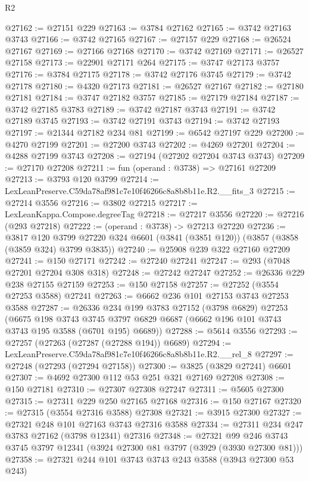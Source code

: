 \begin{lexlean}{R2}
\begin{coremodule}
@27162 := @27151 @229
@27163 := @3784 @27162
@27165 := @3742 @27163 @3743
@27166 := @3742 @27165
@27167 := @27157 @229
@27168 := @26524 @27167
@27169 := @27166 @27168
@27170 := @3742 @27169
@27171 := @26527 @27158
@27173 := @22901 @27171 @264
@27175 := @3747 @27173 @3757
@27176 := @3784 @27175
@27178 := @3742 @27176 @3745
@27179 := @3742 @27178
@27180 := @4320 @27173
@27181 := @26527 @27167
@27182 := @27180 @27181
@27184 := @3747 @27182 @3757
@27185 := @27179 @27184
@27187 := @3742 @27185 @3783
@27189 := @3742 @27187 @3743
@27191 := @3742 @27189 @3745
@27193 := @3742 @27191 @3743
@27194 := @3742 @27193
@27197 := @21344 @27182 @234 @81
@27199 := @6542 @27197 @229
@27200 := @4270 @27199
@27201 := @27200 @3743
@27202 := @4269 @27201
@27204 := @4288 @27199 @3743
@27208 := @27194 (@27202 @27204 @3743 @3743)
@27209 := @27170 @27208
@27211 := fun (operand : @3738) => @27161 @27209
@27213 := @3793 @120 @3799
@27214 := LexLeanPreserve.C59da78af981c7e10f46266c8a8b8b11e.R2.__fits_3
@27215 := @27214 @3556
@27216 := @3802 @27215
@27217 := LexLeanKappa.Compose.degreeTag
@27218 := @27217 @3556
@27220 := @27216 (@293 @27218)
@27222 := (operand : @3738) -> @27213 @27220
@27236 := @3817
    @120
    @3799
    @27220
    @324
    @6601
    (@3841 (@3851 @120))
    (@3857 (@3858 (@3859 @324) @3799 @3835))
@27240 := @25908 @239 @322 @27160 @27209
@27241 := @150 @27171
@27242 := @27240 @27241
@27247 := @293 (@7048 @27201 @27204 @308 @318)
@27248 := @27242 @27247
@27252 := @26336 @229 @238 @27155 @27159
@27253 := @150 @27158
@27257 := @27252 (@3554 @27253 @3588) @27241
@27263 := @6662 @236 @101 @27153 @3743 @27253 @3588
@27287 := @26336
    @234
    @199
    @3783
    @27152
    (@3798 @6829)
    @27253
    (@6675
      @198
      @3743
      @3745
      @3797
      @6829
      @6687
      (@6662 @196 @101 @3743 @3743 @195 @3588 (@6701 @195) @6689))
@27288 := @5614 @3556
@27293 := @27257 (@27263 (@27287 (@27288 @194)) @6689)
@27294 := LexLeanPreserve.C59da78af981c7e10f46266c8a8b8b11e.R2.__rel_8
@27297 := @27248 (@27293 (@27294 @27158))
@27300 := @3825 (@3829 @27241) @6601
@27307 := @4692 @27300 @112 @53 @251 @321 @27169 @27208
@27308 := @150 @27181
@27310 := @27307 @27308 @27247
@27311 := @5605 @27300
@27315 := @27311 @229 @250 @27165 @27168
@27316 := @150 @27167
@27320 := @27315 (@3554 @27316 @3588) @27308
@27321 := @3915 @27300
@27327 := @27321 @248 @101 @27163 @3743 @27316 @3588
@27334 := @27311 @234 @247 @3783 @27162 (@3798 @12341) @27316
@27348 := @27321
    @99
    @246
    @3743
    @3745
    @3797
    @12341
    (@3924 @27300 @81 @3797 (@3929 (@3930 @27300 @81)))
@27358 := @27321 @244 @101 @3743 @3743 @243 @3588 (@3943 @27300 @53 @243)

\end{coremodule}
\end{lexlean}
